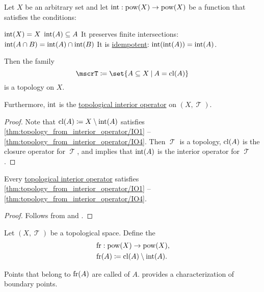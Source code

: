 \begin{proposition}\label{thm:topology_from_interior_operator}
  Let \( X \) be an arbitrary set and let \( \operatorname{int}: \operatorname{pow}(X) \to \operatorname{pow}(X) \) be a function that satisfies the conditions:
  \begin{thmenum}
     \( \operatorname{int}(X) = X \)
     \( \operatorname{int}(A) \subseteq A \)
     It preserves finite intersections: \( \operatorname{int}(A \cap B) = \operatorname{int}(A) \cap \operatorname{int}(B) \)
     It is \hyperref[def:binary_operation/idempotent]{idempotent}: \( \operatorname{int}(\operatorname{int}(A)) = \operatorname{int}(A) \).
  \end{thmenum}

  Then the family
  \begin{equation*}
    \mscrT \coloneqq \set{ A \subseteq X \given A = \cl(A) }
  \end{equation*}
  is a topology on \( X \).

  Furthermore, \( \operatorname{int} \) is the \hyperref[def:topological_interior_operator]{topological interior operator} on \( (X, \mscrT) \).
\end{proposition}
\begin{proof}
  Note that \( \operatorname{cl}(A) \coloneqq X \setminus \operatorname{int}(A) \) satisfies \ref{thm:topology_from_interior_operator/IO1} -- \ref{thm:topology_from_interior_operator/IO4}. Then \( \mscrT \) is a topology, \( \operatorname{cl}(A) \) is the closure operator for \( \mscrT \), and  implies that \( \operatorname{int}(A) \) is the interior operator for \( \mscrT \).
\end{proof}

\begin{proposition}\label{thm:topological_interior_operator_can_generate_topology}
  Every \hyperref[def:topological_interior_operator]{topological interior operator} satisfies \ref{thm:topology_from_interior_operator/IO1} -- \ref{thm:topology_from_interior_operator/IO4}.
\end{proposition}
\begin{proof}
  Follows from  and .
\end{proof}

\begin{definition}\label{def:topological_boundary_operator}
  Let \( (X, \mscrT) \) be a topological space. Define the 
  \begin{equation*}
    \begin{aligned}
      &\operatorname{fr}: \operatorname{pow}(X) \to \operatorname{pow}(X), \\
      &\operatorname{fr}(A) \coloneqq \operatorname{cl}(A) \setminus \operatorname{int}(A).
    \end{aligned}
  \end{equation*}

  Points that belong to \( \operatorname{fr}(A) \) are called  of \( A \).  provides a characterization of boundary points.
\end{definition}


